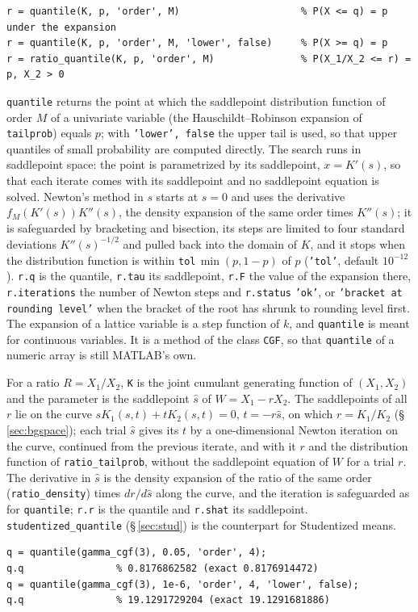 \documentclass[11pt]{article}
\newcommand{\prog}[1]{\texttt{#1}}
\begin{document}
\begin{lstlisting}
r = quantile(K, p, 'order', M)                     % P(X <= q) = p under the expansion
r = quantile(K, p, 'order', M, 'lower', false)     % P(X >= q) = p
r = ratio_quantile(K, p, 'order', M)               % P(X_1/X_2 <= r) = p, X_2 > 0
\end{lstlisting}
\prog{quantile} returns the point at which the saddlepoint distribution function of order $M$ of
a univariate variable (the Hauschildt--Robinson expansion of \prog{tailprob}) equals $p$; with
\prog{'lower', false} the upper tail is used, so that upper quantiles of small probability are
computed directly. The search runs in saddlepoint space: the point is parametrized by its
saddlepoint, $x=K'(s)$, so that each iterate comes with its saddlepoint and no saddlepoint equation
is solved. Newton's method in $s$ starts at $s=0$ and uses the derivative $f_M(K'(s))K''(s)$, the
density expansion of the same order times $K''(s)$; it is safeguarded by bracketing and bisection,
its steps are limited to four standard deviations $K''(s)^{-1/2}$ and pulled back into the domain
of $K$, and it stops when the distribution function is within \prog{tol}$\,\min(p,1-p)$ of $p$
(\prog{'tol'}, default $10^{-12}$). \prog{r.q} is the quantile, \prog{r.tau} its saddlepoint,
\prog{r.F} the value of the expansion there, \prog{r.iterations} the number of Newton steps and
\prog{r.status} \prog{'ok'}, or \prog{'bracket at rounding level'} when the bracket of the root has
shrunk to rounding level first. The expansion of a lattice variable is a step function of $k$, and
\prog{quantile} is meant for continuous variables. It is a method of the class \prog{CGF}, so that
\prog{quantile} of a numeric array is still MATLAB's own.

For a ratio $R=X_1/X_2$, \prog{K} is the joint cumulant generating function of $(X_1,X_2)$ and the
parameter is the saddlepoint $\hat s$ of $W=X_1-rX_2$. The saddlepoints of all $r$ lie on the
curve $sK_1(s,t)+tK_2(s,t)=0$, $t=-r\hat s$, on which $r=K_1/K_2$ (\S\,\ref{sec:bgspace}); each
trial $\hat s$ gives its $t$ by a one-dimensional Newton iteration on the curve, continued from the
previous iterate, and with it $r$ and the distribution function of \prog{ratio\_tailprob}, without
the saddlepoint equation of $W$ for a trial $r$. The derivative in $\hat s$ is the density expansion
of the ratio of the same order (\prog{ratio\_density}) times $dr/d\hat s$ along the curve, and the
iteration is safeguarded as for \prog{quantile}; \prog{r.r} is the quantile and \prog{r.shat} its
saddlepoint. \prog{studentized\_quantile} (\S\,\ref{sec:stud}) is the counterpart for Studentized
means.
\begin{lstlisting}
q = quantile(gamma_cgf(3), 0.05, 'order', 4);
q.q                % 0.8176862582 (exact 0.8176914472)
q = quantile(gamma_cgf(3), 1e-6, 'order', 4, 'lower', false);
q.q                % 19.1291729204 (exact 19.1291681886)
\end{lstlisting}
\end{document}
